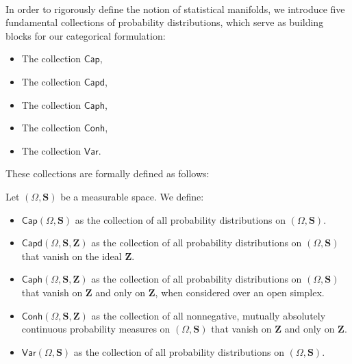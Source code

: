 \, 

In order to rigorously define the notion of statistical manifolds, we introduce five fundamental collections of probability distributions, which serve as building blocks for our categorical formulation:

\begin{itemize}
    \item The collection $\mathsf{Cap}$,
    \item The collection $\mathsf{Capd}$,
    \item The collection $\mathsf{\mathsf{Caph}}$,
    \item The collection $\mathsf{\mathsf{Conh}}$,
    \item The collection $\mathsf{Var}$.
\end{itemize}

These collections are formally defined as follows:

\begin{definition}
    Let $(\Omega, \mathbf{S})$ be a measurable space. We define:
    \begin{itemize}
        \item $\mathsf{Cap}(\Omega, \mathbf{S})$ as the collection of all probability distributions on $(\Omega, \mathbf{S})$.
        
        \item $\mathsf{Capd}(\Omega, \mathbf{S}, \mathbf{Z})$ as the collection of all probability distributions on $(\Omega, \mathbf{S})$ that vanish on the ideal $\mathbf{Z}$.
    
        \item $\mathsf{\mathsf{Caph}}(\Omega, \mathbf{S}, \mathbf{Z})$ as the collection of all probability distributions on $(\Omega, \mathbf{S})$ that vanish on $\mathbf{Z}$ and only on $\mathbf{Z}$, when considered over an open simplex.
        
        \item $\mathsf{\mathsf{Conh}}(\Omega, \mathbf{S}, \mathbf{Z})$ as the collection of all nonnegative, mutually absolutely continuous probability measures on $(\Omega, \mathbf{S})$ that vanish on $\mathbf{Z}$ and only on $\mathbf{Z}$.
      
        \item $\mathsf{Var}(\Omega, \mathbf{S})$ as the collection of all probability distributions on $(\Omega, \mathbf{S})$.
    \end{itemize}
\end{definition}

